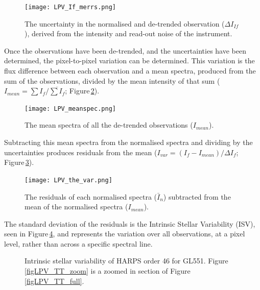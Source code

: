 \begin{figure}
    \centering
    \captionsetup{width=.8\textwidth}
    \texttt{[image: LPV\_If\_merrs.png]}
    \caption{The uncertainty in the normalised and de-trended observation ($\Delta I_{If}$), derived from the intensity and read-out noise of the instrument.}
    \label{figLPV_If_errs}
\end{figure}

Once the observations have been de-trended, and the uncertainties have been determined, the pixel-to-pixel variation can be determined. This variation is the flux difference between each observation and a mean spectra, produced from the sum of the observations, divided by the mean intensity of that sum ($I_{mean}=\sum I_f/\overline{\sum I_f}$; Figure\,\ref{figLPV_meanspec}).\\

\begin{figure}
    \centering
    \captionsetup{width=.8\textwidth}
    \texttt{[image: LPV\_meanspec.png]}
    \caption{The mean spectra of all the de-trended observations ($I_{mean}$).}
    \label{figLPV_meanspec}
\end{figure}

Subtracting this mean spectra from the normalised spectra and dividing by the uncertainties produces residuals from the mean ($I_{var}=(I_f-I_{mean})/\Delta I_f$; Figure\,\ref{figLPV_thevar}).\\

\begin{figure}
    \centering
    \captionsetup{width=.8\textwidth}
    \texttt{[image: LPV\_the\_var.png]}
    \caption{The residuals of each normalised spectra ($\bar{I}_n$) subtracted from the mean of the normalised spectra ($I_{mean}$).}
    \label{figLPV_thevar}
\end{figure}

The standard deviation of the residuals is the Intrinsic Stellar Variability (ISV), seen in Figure\,\ref{figLPV_TT}, and represents the variation over all observations, at a pixel level, rather than across a specific spectral line. 

\begin{figure}
	\hspace{-2cm}
	\captionsetup{width=.8\textwidth}
    \caption{Intrinsic stellar variability of HARPS order 46 for GL551. Figure\,\ref{figLPV_TT_zoom} is a zoomed in section of Figure\,\ref{figLPV_TT_full}.}
    \label{figLPV_TT}
\end{figure}

